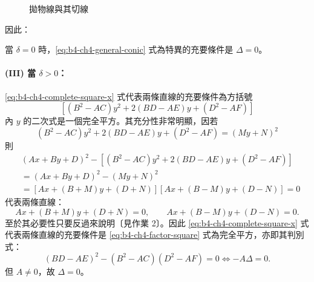 \begin{figure}[htbp]
\centering
{}
\caption{拋物線與其切線}
\label{fig:b4-ch4-fig1-2}
\end{figure}

因此：
\begin{proposition}
當 $\delta = 0$ 時，\eqref{eq:b4-ch4-general-conic} 式為特異的充要條件是 $\Delta = 0$。
\end{proposition}

\paragraph*{(III) 當 $\delta > 0$：}
\eqref{eq:b4-ch4-complete-square-x} 式代表兩條直線的充要條件為方括號
\[
[(B^2 - AC)y^2 + 2(BD - AE)y + (D^2 - AF)]
\]
內 $y$ 的二次式是一個完全平方。其充分性非常明顯，因若
\begin{equation}
(B^2 - AC)y^2 + 2(BD - AE)y + (D^2 - AF) = (My + N)^2
\label{eq:b4-ch4-factor-square}
\end{equation}
則
\[
\begin{aligned}
&(Ax + By + D)^2 - [(B^2 - AC)y^2 + 2(BD - AE)y + (D^2 - AF)] \\
&= (Ax + By + D)^2 - (My + N)^2 \\
&= [Ax + (B + M)y + (D + N)][Ax + (B - M)y + (D - N)] = 0
\end{aligned}
\]
代表兩條直線：
\[
Ax + (B + M)y + (D + N) = 0, \qquad
Ax + (B - M)y + (D - N) = 0.
\]
至於其必要性只要反過來說明〔見作業 2〕。因此 \eqref{eq:b4-ch4-complete-square-x} 式代表兩條直線的充要條件是 \eqref{eq:b4-ch4-factor-square} 式為完全平方，亦即其判別式：
\[
(BD - AE)^2 - (B^2 - AC)(D^2 - AF) = 0 \iff -A\Delta = 0.
\]
但 $A \ne 0$，故 $\Delta = 0$。

